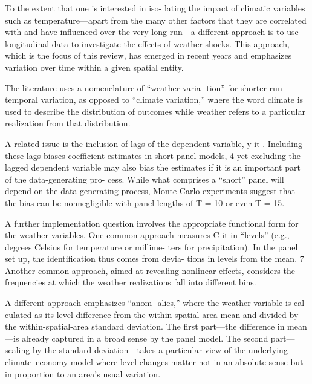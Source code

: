\documentclass[
]{book}
\begin{document}
To the extent that one is interested in iso-
lating the impact of climatic variables such
as temperature---apart from the many other
factors that they are correlated with and
have influenced over the very long run---a
different approach is to use longitudinal
data to investigate the effects of weather
shocks. This approach, which is the focus
of this review, has emerged in recent years
and emphasizes variation over time within a
given spatial entity.

The literature
uses a nomenclature of ``weather varia-
tion'' for shorter-run temporal variation, as
opposed to ``climate variation,'' where the
word climate is used to describe the distribution of outcomes
while weather
refers to a particular realization from that
distribution.

A related issue is the inclusion of lags of the
dependent variable, \hspace{0pt} y\hspace{0pt} it \hspace{0pt} . Including these lags
biases coefficient estimates in short panel
models, 4 yet excluding the lagged dependent
variable may also bias the estimates if it is an
important part of the data-generating pro-
cess. While what comprises a ``short'' panel
will depend on the data-generating process,
Monte Carlo experiments suggest that the
bias can be nonnegligible with panel lengths
of T = 10 or even T = 15.

A further implementation question
involves the appropriate functional form
for the weather variables. One common
approach measures \hspace{0pt}
C \hspace{0pt} it \hspace{0pt} in ``levels'' (e.g.,
degrees Celsius for temperature or millime-
ters for precipitation). In the panel set up,
the identification thus comes from devia-
tions in levels from the mean. 7 Another common
approach, aimed at revealing nonlinear
effects, considers the frequencies at which
the weather realizations fall into different
bins.

A different approach emphasizes ``anom-
alies,'' where the weather variable is cal-
culated as its level difference from the
within-spatial-area mean and divided by
­
the within-spatial-area standard deviation.
The first part---the difference in mean---is
already captured in a broad sense by the
panel model. The second part---scaling by
the standard deviation---takes a particular
view of the underlying climate--economy
model where level changes matter not in an
absolute sense but in proportion to an area's
usual variation.
\end{document}
